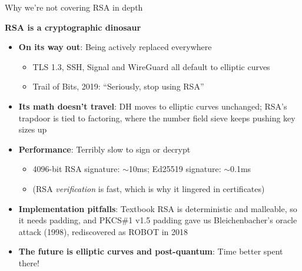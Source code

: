 \ifdefined\PRESENTATION\else\PassOptionsToClass{handout}{beamer}\fi\documentclass[aspectratio=169, lualatex]{beamer}
\begin{document}
\begin{frame}{Why we're not covering RSA in depth}
	\begin{center}
		\Large\textbf{RSA is a cryptographic dinosaur}
	\end{center}
	\begin{itemize}[<+->]
		\item \textbf{On its way out}: Being actively replaced everywhere
		      \begin{itemize}
			      \item TLS 1.3, SSH, Signal and WireGuard all default to elliptic curves
			      \item Trail of Bits, 2019: ``Seriously, stop using RSA''
		      \end{itemize}
		\item \textbf{Its math doesn't travel}: DH moves to elliptic curves unchanged; RSA's trapdoor is tied to factoring, where the number field sieve keeps pushing key sizes up
		\item \textbf{Performance}: Terribly slow to sign or decrypt
		      \begin{itemize}
			      \item 4096-bit RSA signature: $\sim$10ms; Ed25519 signature: $\sim$0.1ms
			      \item (RSA \emph{verification} is fast, which is why it lingered in certificates)
		      \end{itemize}
		\item \textbf{Implementation pitfalls}: Textbook RSA is deterministic and malleable, so it needs padding, and PKCS\#1 v1.5 padding gave us Bleichenbacher's oracle attack (1998), rediscovered as ROBOT in 2018
		\item \textbf{The future is elliptic curves and post-quantum}: Time better spent there!
	\end{itemize}
\end{frame}

\begin{frame}[plain]
	\titlepage
\end{frame}
\end{document}
